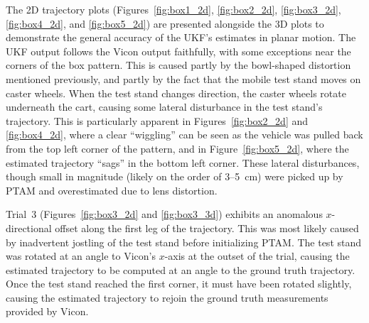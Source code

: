 The 2D trajectory plots (Figures~\ref{fig:box1_2d}, \ref{fig:box2_2d}, \ref{fig:box3_2d}, \ref{fig:box4_2d}, and \ref{fig:box5_2d}) are presented alongside the 3D plots to demonstrate the general accuracy of the UKF's estimates in planar motion. The UKF output follows the Vicon output faithfully, with some exceptions near the corners of the box pattern. This is caused partly by the bowl-shaped distortion mentioned previously, and partly by the fact that the mobile test stand moves on caster wheels. When the test stand changes direction, the caster wheels rotate underneath the cart, causing some lateral disturbance in the test stand's trajectory. This is particularly apparent in Figures~\ref{fig:box2_2d} and \ref{fig:box4_2d}, where a clear ``wiggling'' can be seen as the vehicle was pulled back from the top left corner of the pattern, and in Figure~\ref{fig:box5_2d}, where the estimated trajectory ``sags'' in the bottom left corner. These lateral disturbances, though small in magnitude (likely on the order of 3--5~cm) were picked up by PTAM and overestimated due to lens distortion.

Trial~3 (Figures~\ref{fig:box3_2d} and \ref{fig:box3_3d}) exhibits an anomalous $x$-directional offset along the first leg of the trajectory. This was most likely caused by inadvertent jostling of the test stand before initializing PTAM. The test stand was rotated at an angle to Vicon's $x$-axis at the outset of the trial, causing the estimated trajectory to be computed at an angle to the ground truth trajectory. Once the test stand reached the first corner, it must have been rotated slightly, causing the estimated trajectory to rejoin the ground truth measurements provided by Vicon.

\clearpage

